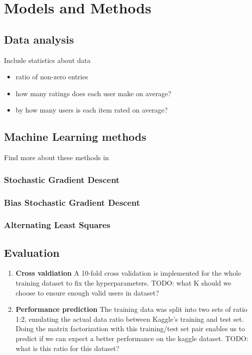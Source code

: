 \section{Models and Methods}

\subsection{Data analysis}
Include statistics about data 

\begin{itemize}
  \item ratio of non-zero entries
  \item how many ratings does each user make on average?
  \item by how many users is each item rated on average? 
\end{itemize}


\subsection{Machine Learning methods}
Find more about these methods in \cite{Aberger2009}
\subsubsection{Stochastic Gradient Descent}
\subsubsection{Bias Stochastic Gradient Descent}
\subsubsection{Alternating Least Squares}

\subsection{Evaluation}

\begin{enumerate}
  \item \textbf{Cross valdiation} A 10-fold cross validation is implemented
    for the whole training dataset to fix the hyperparameters. 
    TODO: what K should we choose to ensure enough valid users in dataset?   
  \item \textbf{Performance prediction} The training data was split into two
    sets of ratio 1:2, emulating the actual data ratio between Kaggle's training
    and test set. Doing the matrix factorization with this training/test set
    pair enables us to predict if we can expect a better performance on the
    kaggle dataset.  
    TODO: what is this ratio for this dataset? 
\end{enumerate}
